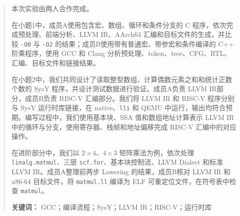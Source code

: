 \newpage
\thispagestyle{empty}
\renewcommand{\abstractname}{\kaishu \sihao \textbf{摘要}}
\begin{abstract}
\normalsize
\indent 本次实验由两人合作完成。

在小题1中，成员A使用包含宏、数组、循环和条件分支的 C 程序，依次完成预处理、前端分析、LLVM IR、AArch64 汇编和目标文件的生成，并比较 \texttt{-O0} 与 \texttt{-O2} 的结果；成员B使用带有普通宏、带参宏和条件编译的 C++ 阶乘程序，使用 GCC 和 Clang 分析预处理、token、tree、CFG、RTL、汇编、目标文件和链接结果。

在小题2中，我们共同设计了读取整型数组、计算偶数元素之和和统计正数个数的 SysY 程序，并设计测试数据进行验证。成员A负责 LLVM IR部分，成员B负责 RISC-V 汇编部分。我们将 LLVM IR 和 RISC-V 程序分别与 SysY 运行时库链接，在 native、\texttt{lli} 和 QEMU 中运行，输出均符合预期。编写过程中，我们使用基本块、SSA 值和数组地址计算表示 LLVM IR 中的循环与分支，使用寄存器、栈帧和地址偏移完成 RISC-V 汇编中的对应操作。

在进阶部分中，我们以 $2\times4$、$4\times3$ 矩阵乘法为例，依次处理 \texttt{linalg.matmul}、三层 \texttt{scf.for}、基本块控制流、LLVM Dialect 和标准 LLVM IR。成员A整理前两步 Lowering 的结果，成员B核对 LLVM IR 和 x86-64 目标文件，将 \texttt{matmul.ll} 编译为 ELF 可重定位文件，在符号表中检查 \texttt{matmul}。

\noindent\textbf{关键词：} GCC；编译流程；SysY；LLVM IR；RISC-V；运行时库
\end{abstract}
